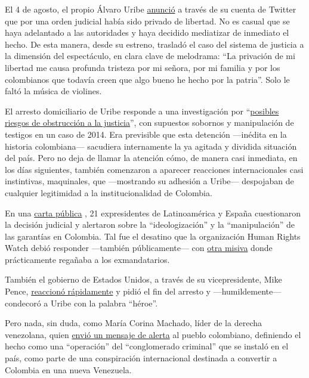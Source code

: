 El 4 de agosto, el propio Álvaro Uribe
\href{https://twitter.com/AlvaroUribeVel/status/1290712262504779784}{anunció}
a través de su cuenta de Twitter que por una orden judicial había sido
privado de libertad. No es casual que se haya adelantado a las
autoridades y haya decidido mediatizar de inmediato el hecho. De esta
manera, desde su estreno, trasladó el caso del sistema de justicia a la
dimensión del espectáculo, en clara clave de melodrama: ``La privación
de mi libertad me causa profunda tristeza por mi señora, por mi familia
y por los colombianos que todavía creen que algo bueno he hecho por la
patria''. Solo le faltó la música de violines.

El arresto domiciliario de Uribe responde a una investigación por
``\href{https://www.bbc.com/mundo/noticias-america-latina-53604677}{posibles
riesgos de obstrucción a la justicia}'', con supuestos sobornos y
manipulación de testigos en un caso de 2014. Era previsible que esta
detención ---inédita en la historia colombiana--- sacudiera internamente
la ya agitada y dividida situación del país. Pero no deja de llamar la
atención cómo, de manera casi inmediata, en los días siguientes, también
comenzaron a aparecer reacciones internacionales casi instintivas,
maquinales, que ---mostrando su adhesión a Uribe--- despojaban de
cualquier legitimidad a la institucionalidad de Colombia.

En una
\href{https://www.eltiempo.com/politica/congreso/alvaro-uribe-expresidentes-de-espana-y-america-latina-se-solidarizan-con-el-senador-527784}{carta
pública} , 21 expresidentes de Latinoamérica y España cuestionaron la
decisión judicial y alertaron sobre la ``ideologización'' y la
``manipulación'' de las garantías en Colombia. Tal fue el desatino que
la organización Human Rights Watch debió responder ---también
públicamente--- con
\href{https://www.eltiempo.com/mundo/eeuu-y-canada/la-carta-de-hrw-a-expresidentes-que-criticaron-la-detencion-de-uribe-531646}{otra
misiva} donde prácticamente regañaba a los exmandatarios.

También el gobierno de Estados Unidos, a través de su vicepresidente,
Mike Pence,
\href{https://elpais.com/internacional/2020-08-14/el-vicepresidente-de-ee-uu-mike-pence-pide-el-fin-del-arresto-domiciliario-de-alvaro-uribe.html}{reaccionó
rápidamente} y pidió el fin del arresto y ---humildemente--- condecoró a
Uribe con la palabra ``héroe''.

Pero nada, sin duda, como María Corina Machado, líder de la derecha
venezolana, quien
\href{https://www.alertatolima.com/noticias/politica/maria-corina-machado-advirtio-que-detencion-de-uribe-hace-parte-de-una-operacion}{envió
un mensaje de alerta} al pueblo colombiano, definiendo el hecho como una
``operación'' del ``conglomerado criminal'' que se instaló en el país,
como parte de una conspiración internacional destinada a convertir a
Colombia en una nueva Venezuela.

